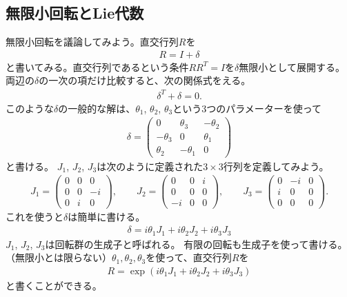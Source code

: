 \documentclass[10pt,a4paper]{jarticle}
\begin{document}
\subsection{無限小回転とLie代数}
無限小回転を議論してみよう。直交行列$R$を
\begin{align}
R = I + \delta
\end{align}
と書いてみる。直交行列であるという条件$R R^T = I$を$\delta$無限小として展開する。
両辺の$\delta$の一次の項だけ比較すると、次の関係式をえる。
\begin{align}
\delta^T + \delta = 0. \label{eq:SO3 small rotation}
\end{align}
このような$\delta$の一般的な解は、$\theta_1$, $\theta_2$, $\theta_3$という3つのパラメーターを使って
\begin{align}
\delta = \left(\begin{array}{ccc}
0 & \theta_3 & -\theta_2 \\
-\theta_3 & 0 & \theta_1 \\
\theta_2 & -\theta_1 & 0
\end{array}\right) \label{eq:SO3 small rotation2}
\end{align}
と書ける。
$J_1$, $J_2$, $J_3$は次のように定義された$3\times 3$行列を定義してみよう。
\begin{align}
J_1 = \left(\begin{array}{ccc}
0 & 0 & 0 \\
0 & 0 & -i\\
0 & i & 0
\end{array}\right), \qquad
%
J_2 = \left(\begin{array}{ccc}
0 & 0 & i\\
 0 & 0 & 0 \\
-i & 0 & 0
\end{array}\right), \qquad
%
J_3 = \left(\begin{array}{ccc}
0 & -i & 0 \\
i & 0 & 0 \\
0 & 0 & 0 
\end{array}\right).\label{eq:SO3 generator matrix}
\end{align}
これを使うと$\delta$は簡単に書ける。
\begin{align}
\delta = i \theta_1 J_1 + i \theta_2 J_2 + i \theta_3 J_3 \label{eq:SO3 generator}
\end{align}
$J_1$, $J_2$, $J_3$は回転群の生成子と呼ばれる。
%
有限の回転も生成子を使って書ける。（無限小とは限らない）$\theta_1, \theta_2, \theta_3$を使って、直交行列$R$を
\begin{align}
R = \exp\left( i \theta_1 J_1 + i \theta_2 J_2 + i\theta_3 J_3 \right)
\end{align}
と書くことができる。
\end{document}
